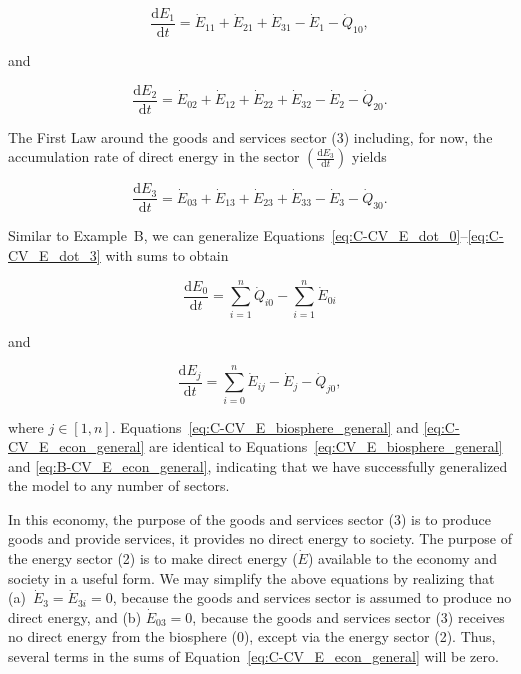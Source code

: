 \begin{equation} \label{eq:C-CV_E_dot_1}
	\frac{\mathrm{d}E_{1}}{\mathrm{d}t}
	= \dot{E}_{11}
	+ \dot{E}_{21}  
	+ \dot{E}_{31} 
	- \dot{E}_{1}
	- \dot{Q}_{10},
\end{equation}

\noindent and 

\begin{equation} \label{eq:C-CV_E_dot_2}
	\frac{\mathrm{d}E_{2}}{\mathrm{d}t} 	 
	= \dot{E}_{02} 
	+ \dot{E}_{12}
	+ \dot{E}_{22} 
	+ \dot{E}_{32} 
	- \dot{E}_{2} 
	- \dot{Q}_{20}.
\end{equation}

The First Law around the goods and services sector (3) including, 
for now, the accumulation rate of direct energy in the sector 
$\left(\frac{\mathrm{d}E_{3}}{\mathrm{d}t}\right)$ yields

\begin{equation} \label{eq:C-CV_E_dot_3}
	\frac{\mathrm{d}E_{3}}{\mathrm{d}t} 
	= \dot{E}_{03} 
	+ \dot{E}_{13}
	+ \dot{E}_{23} 
	+ \dot{E}_{33} 
	- \dot{E}_3 
	- \dot{Q}_{30}.
\end{equation}

Similar to Example~B, we can generalize 
Equations~\ref{eq:C-CV_E_dot_0}--\ref{eq:C-CV_E_dot_3}
with sums to obtain

\begin{equation} \label{eq:C-CV_E_biosphere_general}
	\frac{\mathrm{d}E_{0}}{\mathrm{d}t} 	 
	= \sum\limits_{i=1}^n \dot{Q}_{i0} - \sum\limits_{i=1}^n \dot{E}_{0i}
\end{equation}

\noindent and

\begin{equation} \label{eq:C-CV_E_econ_general}
	\frac{\mathrm{d}E_{j}}{\mathrm{d}t} 
	= \sum\limits_{i=0}^n\dot{E}_{ij} 
	- \dot{E}_{j}  
	- \dot{Q}_{j0},
\end{equation}

\noindent where $j \in [1, n]$. 
Equations~\ref{eq:C-CV_E_biosphere_general} and 
\ref{eq:C-CV_E_econ_general} are identical to 
Equations~\ref{eq:CV_E_biosphere_general} and 
\ref{eq:B-CV_E_econ_general}, 
indicating that we have successfully generalized 
the model to any number of sectors.

In this economy, the purpose of the goods and services sector (3) 
is to produce goods and provide services, 
it provides no direct energy to society. 
The purpose of the energy sector (2) is to make direct energy ($\dot{E}$) 
available to the economy and society in a useful form.
We may simplify the above equations
by realizing that (a)~$\dot{E}_{3} = \dot{E}_{3i} = 0$, 
because the goods and services sector 
is assumed to produce no direct energy, 
and (b) $\dot{E}_{03} = 0$, 
because the goods and services sector (3) 
receives no direct energy from the biosphere (0), 
except via the energy sector (2).
Thus, several terms in the sums of
Equation~\ref{eq:C-CV_E_econ_general}
will be zero.



